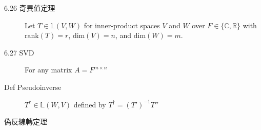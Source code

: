 \documentclass[9pt, twocolumn]{extarticle}
\newcommand{\vsdim}{\ensuremath{\text{dim}}}
\newcommand{\rank}{\ensuremath{\text{rank}}}
\newcommand{\realnum}{\mathbb{R}}
\newcommand{\complexnum}{\mathbb{C}}
\newcommand{\ltrans}{\mathbb{L}}
\begin{document}
\begin{description}
    \item[6.26 奇異值定理] Let $T \in \ltrans(V, W)$ for inner-product spaces $V$ and $W$ over $F \in \{\complexnum, \realnum\}$ with $\rank(T)=r$, $\vsdim(V) = n$, and $\vsdim(W) = m$.
    \item[6.27 SVD] For any matrix $A = F^{m\times n}$

    \item[Def Pseudoinverse] $T^\dagger \in \ltrans(W, V)$ defined by $T^\dagger = (T')^{-1}T''$
    \item[偽反線轉定理]

\end{description}
\end{document}
